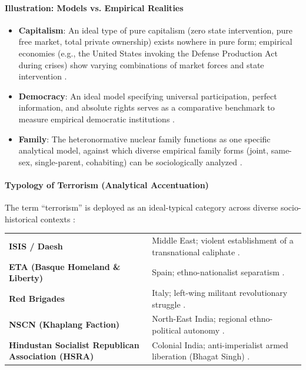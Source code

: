 \paragraph{Illustration: Models vs. Empirical Realities}
\begin{itemize}
    \item \textbf{Capitalism}: An ideal type of pure capitalism (zero state intervention, pure free market, total private ownership) exists nowhere in pure form; empirical economies (e.g., the United States invoking the Defense Production Act during crises) show varying combinations of market forces and state intervention .
    \item \textbf{Democracy}: An ideal model specifying universal participation, perfect information, and absolute rights serves as a comparative benchmark to measure empirical democratic institutions .
    \item \textbf{Family}: The heteronormative nuclear family functions as one specific analytical model, against which diverse empirical family forms (joint, same-sex, single-parent, cohabiting) can be sociologically analyzed .
\end{itemize}

\paragraph{Typology of Terrorism (Analytical Accentuation)}
The term ``terrorism'' is deployed as an ideal-typical category across diverse socio-historical contexts :

\begin{table}[htbp]
\centering
\begin{tabularx}{\textwidth}{p{4.8cm} Y}
\hline
{}
 &  \\
\hline
\textbf{ISIS / Daesh} & Middle East; violent establishment of a transnational caliphate . \\
\textbf{ETA (Basque Homeland \& Liberty)} & Spain; ethno-nationalist separatism . \\
\textbf{Red Brigades} & Italy; left-wing militant revolutionary struggle . \\
\textbf{NSCN (Khaplang Faction)} & North-East India; regional ethno-political autonomy . \\
\textbf{Hindustan Socialist Republican Association (HSRA)} & Colonial India; anti-imperialist armed liberation (Bhagat Singh) . \\
\hline
\end{tabularx}
\end{table}

